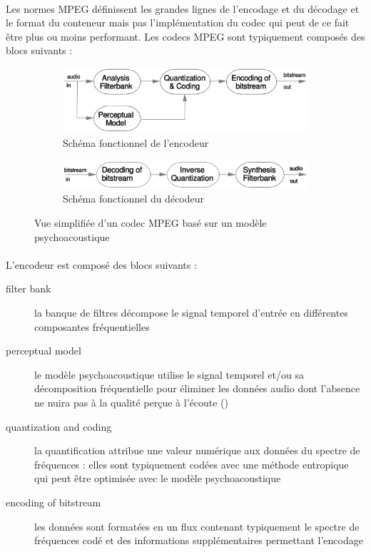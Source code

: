 \documentclass{article}
\begin{document}
    \paragraph{}
    Les normes MPEG définissent les grandes lignes de l'encodage et du décodage et le format du conteneur mais pas l'implémentation du codec qui peut de ce fait être plus ou moins performant. Les codecs MPEG sont typiquement composés des blocs suivants\cite{1999-Brandenburg} :
    \begin{figure}[H]
        \centering
        \begin{subfigure}[b]{.6\linewidth}
            \includegraphics[width=\linewidth]{./images/1999-Brandenburg-simple-AAC-encoder.png}
            \caption{Schéma fonctionnel de l'encodeur}
        \end{subfigure}
        \begin{subfigure}[b]{.6\linewidth}
            \includegraphics[width=\linewidth]{./images/1999-Brandenburg-simple-AAC-decoder.png}
            \caption{Schéma fonctionnel du décodeur}
        \end{subfigure}
        \caption{Vue simplifiée d'un codec MPEG basé sur un modèle psychoacoustique}
    \end{figure}
    \paragraph{}
    L'encodeur est composé des blocs suivants :
    \begin{description}
        \item[filter bank] la banque de filtres décompose le signal temporel d'entrée en différentes composantes fréquentielles
        \item[perceptual model] le modèle psychoacoustique utilise le signal temporel et/ou sa décomposition fréquentielle pour éliminer les données audio dont l'absence ne nuira pas à la qualité perçue à l'écoute ()
        \item[quantization and coding] la quantification attribue une valeur numérique aux données du spectre de fréquences : elles sont typiquement codées avec une méthode entropique qui peut être optimisée avec le modèle psychoacoustique
        \item[encoding of bitstream] les données sont formatées en un flux contenant typiquement le spectre de fréquences codé et des informations supplémentaires permettant l'encodage
    \end{description}
    
\end{document}
